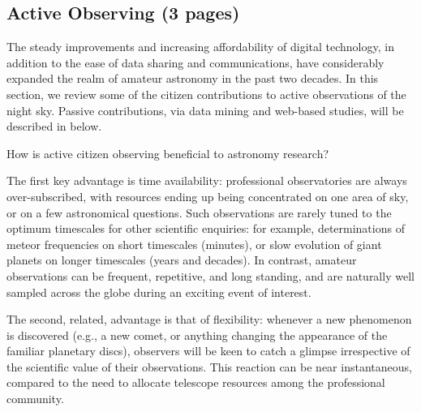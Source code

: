 \documentclass{ar2e}
\begin{document}
\subsection{Active Observing (3 pages)}
\label{sec:obs:active}



The steady improvements and increasing affordability of digital technology, in
addition to the ease of data sharing and communications, have considerably
expanded the realm of amateur astronomy in the past two decades.  
In this section, we review some of the citizen contributions to active
observations of the night sky.  Passive contributions, via data mining and
web-based studies, will be described in  below.

How is active citizen observing beneficial to astronomy research? 

The first key advantage is time availability: professional observatories are
always over-subscribed, with resources ending up being concentrated on one area
of sky, or on a few astronomical questions.  Such observations are rarely tuned
to the optimum timescales for other scientific enquiries: for example,
determinations of meteor frequencies on short timescales (minutes), or slow
evolution of giant planets on longer timescales (years and decades).  In
contrast, amateur observations can be frequent, repetitive, and long standing,
and are naturally well sampled across the globe during an exciting event of
interest. 

The second, related, advantage is that of flexibility: whenever a new phenomenon
is discovered (e.g., a new comet, or anything changing the appearance of the
familiar planetary discs), observers will be keen to catch a glimpse
irrespective of the scientific value of their observations.  This reaction can
be near instantaneous, compared to the need to allocate telescope resources
among the professional community.  
\end{document}
